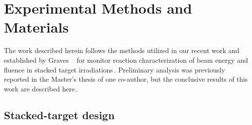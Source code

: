 % 
% 

\section{\label{sec:experimental_fe}Experimental Methods and Materials}


The work described herein follows the  methods utilized in our recent work and established by Graves \etal\ 
for monitor reaction characterization of beam energy and fluence in stacked target irradiations\,\cite{Voyles2018a,Graves2016}.
% 
% 
% 
Preliminary analysis  was previously reported in the Master's thesis of one co-author, but the conclusive results of this work are described here\,\cite{springer2017investigation}.



\subsection{\label{sec:target_design_fe}Stacked-target design}



